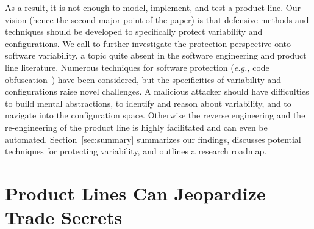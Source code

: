 \documentclass{sig-alternate}
\newcommand{\eg}{\emph{e.g.,}\xspace}
\begin{document}
As a result, it is not enough to model, implement, and test a product line. 
Our vision (hence the second major point of the paper) is that defensive methods and techniques should be developed to specifically protect variability and configurations. %
 We call to further investigate the protection perspective onto software variability, a topic quite absent in the software engineering and product line literature. Numerous techniques for software protection (\eg code obfuscation~\cite{collberg1997taxonomy}) have been considered, but the specificities of variability and configurations raise novel challenges. 
 A malicious attacker should have difficulties to build mental abstractions, to identify and reason about variability, and to navigate into the configuration space. Otherwise the reverse engineering and the re-engineering of the product line is highly facilitated and can even be automated. 
Section~\ref{sec:summary} summarizes our findings, discusses potential techniques for protecting variability, and outlines a research roadmap. 
% 
 
 




 







\section{Product Lines Can Jeopardize\\ Trade Secrets} %
\label{sec:casestudy}
%
\end{document}
